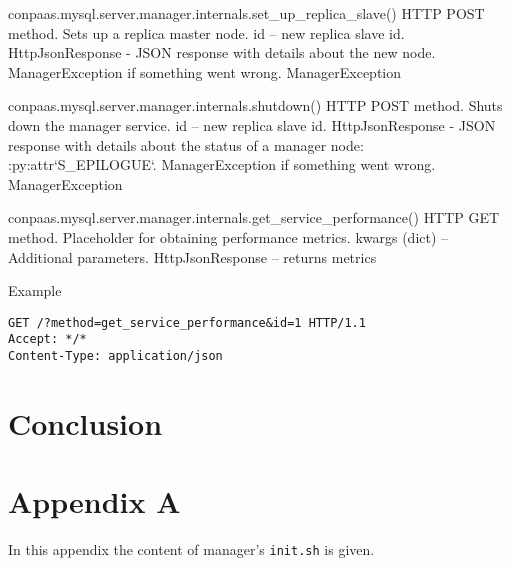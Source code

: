 \documentclass[a4paper,10pt]{article}
\begin{document}
\noindent\conapi
{ conpaas.mysql.server.manager.internals.set\_up\_replica\_slave()}
{HTTP POST method. Sets up a replica master node.}
{  id -- new replica slave id.}
{ HttpJsonResponse - JSON response with details about the new
      node. ManagerException if something went wrong.}
{ManagerException}


\noindent\conapi
{ conpaas.mysql.server.manager.internals.shutdown()}
{HTTP POST method. Shuts down the manager service.}
{  id -- new replica slave id.}
{ HttpJsonResponse - JSON response with details about the status
      of a manager node: :py:attr`S\_EPILOGUE`. ManagerException if
      something went wrong.}
{ManagerException}

\noindent\conapi
{ conpaas.mysql.server.manager.internals.get\_service\_performance()}
{ HTTP GET method. Placeholder for obtaining performance metrics.}
{ kwargs (dict) -- Additional parameters.}
{HttpJsonResponse -- returns metrics}
{}

Example
\begin{Verbatim}[frame=single]
GET /?method=get_service_performance&id=1 HTTP/1.1
Accept: */*
Content-Type: application/json
\end{Verbatim}

\newpage

\section{Conclusion}

\newpage

\section{Appendix A}
\label{app:install}

In this appendix the content of manager's {\tt init.sh} is given.
\end{document}
